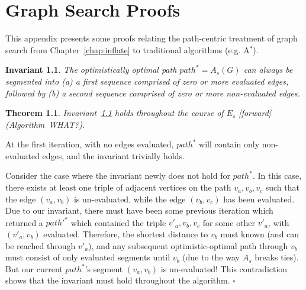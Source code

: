 \documentclass{report}
\newtheorem{invariant}{Invariant}
\newtheorem{theorem}{Theorem}
\newenvironment{proof}[1][Proof]{\begin{trivlist}
   \item[\hskip \labelsep {\bfseries #1}]}{\hfill$\square$\end{trivlist}}
\begin{document}
\appendix
\chapter{Graph Search Proofs}
\label{appendix:gs-proofs}

This appendix presents some proofs relating the path-centric treatment
of graph search from Chapter~\ref{chap:inflate}
to traditional algorithms (e.g. A$^*$).

\begin{invariant}
The optimistically optimal path $path^* = A_s(G)$ can always be
segmented into
(a) a first sequence comprised of zero or more evaluated edges,
followed by
(b) a second sequence comprised of zero or more non-evaluated edges.
\label{inv:path-segmentation}
\end{invariant}

\begin{theorem}
Invariant~\ref{inv:path-segmentation} holds throughout the course of
$E_s$ [forward] (Algorithm~WHAT?).
\label{thm:seg-fwd}
\end{theorem}

\begin{proof}
At the first iteration, with no edges evaluated,
$path^*$ will contain only non-evaluated edges,
and the invariant trivially holds.

Consider the case where the invariant newly does not hold for $path^*$.
In this case, there exists at least one triple of adjacent vertices
on the path $v_a, v_b, v_c$
such that the edge $(v_a, v_b)$ is un-evaluated,
while the edge $(v_b, v_c)$ has been evaluated.
Due to our invariant,
there must have been some previous iteration which returned a
$path'^*$ which contained the triple
$v'_a, v_b, v_c$ for some other $v'_a$,
with $(v'_a, v_b)$ evaluated.
Therefore, the shortest distance to $v_b$ must known (and can be
reached through $v'_a$),
and any subsequent optimistic-optimal path through $v_b$
must consist of only evaluated segments until $v_b$
(due to the way $A_s$ breaks ties).
But our current $path^*$'s segment $(v_a, v_b)$ is un-evaluated!
This contradiction shows that the invariant must hold throughout the
algorithm.
\end{proof}
\end{document}
